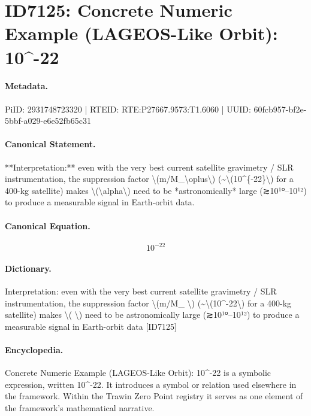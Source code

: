 \section*{ID7125: Concrete Numeric Example (LAGEOS-Like Orbit): 10\textasciicircum{}-22}
\paragraph{Metadata.}
PiID: 2931748723320 | RTEID: RTE:P27667.9573:T1.6060 | UUID: 60fcb957-bf2e-5bbf-a029-e6e52fb65c31

\paragraph{Canonical Statement.}
**Interpretation:** even with the very best current satellite gravimetry / SLR instrumentation, the suppression factor \textbackslash{}(m/M\_\textbackslash{}oplus\textbackslash{}) (\textasciitilde{}\textbackslash{}(10\textasciicircum{}\{-22\}\textbackslash{}) for a 400-kg satellite) makes \textbackslash{}(\textbackslash{}alpha\textbackslash{}) need to be *astronomically* large (≳10¹⁰–10¹²) to produce a measurable signal in Earth-orbit data.

\paragraph{Canonical Equation.}
\[
10^{-22}
\]

\paragraph{Dictionary.}
Interpretation: even with the very best current satellite gravimetry / SLR instrumentation, the suppression factor \textbackslash{}(m/M\_ \textbackslash{}) (\textasciitilde{}\textbackslash{}(10\textasciicircum{}-22\textbackslash{}) for a 400-kg satellite) makes \textbackslash{}( \textbackslash{}) need to be astronomically large (≳10¹⁰–10¹²) to produce a measurable signal in Earth-orbit data [ID7125]

\paragraph{Encyclopedia.}
Concrete Numeric Example (LAGEOS-Like Orbit): 10\textasciicircum{}-22 is a symbolic expression, written 10\textasciicircum{}-22. It introduces a symbol or relation used elsewhere in the framework. Within the Trawin Zero Point registry it serves as one element of the framework's mathematical narrative.
